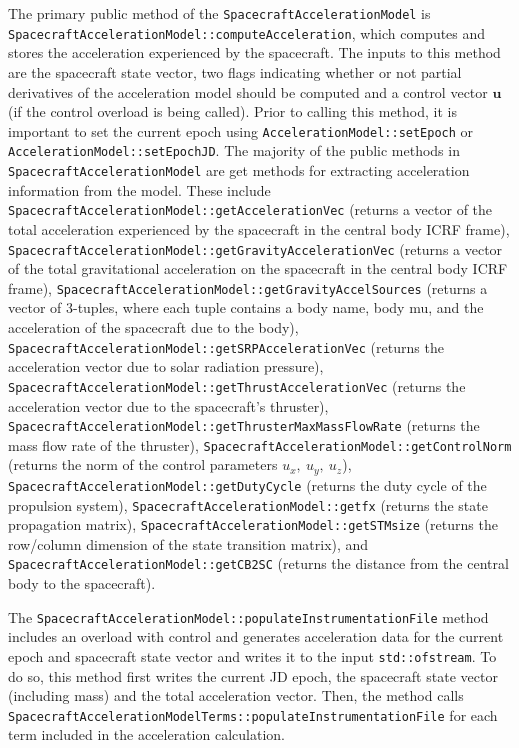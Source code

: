 The primary public method of the \texttt{SpacecraftAccelerationModel} is \texttt{SpacecraftAccelerationModel::computeAcceleration}, which computes and stores the acceleration experienced by the spacecraft. The inputs to this method are the spacecraft state vector, two flags indicating whether or not partial derivatives of the acceleration model should be computed and a control vector $\mathbf{u}$ (if the control overload is being called). Prior to calling this method, it is important to set the current epoch using \texttt{AccelerationModel::setEpoch} or \texttt{AccelerationModel::setEpochJD}. The majority of the public methods in \texttt{SpacecraftAccelerationModel} are get methods for extracting acceleration information from the model. These include \texttt{SpacecraftAccelerationModel::getAccelerationVec} (returns a vector of the total acceleration experienced by the spacecraft in the central body ICRF frame), \texttt{SpacecraftAccelerationModel::getGravityAccelerationVec} (returns a vector of the total gravitational acceleration on the spacecraft in the central body ICRF frame), \texttt{SpacecraftAccelerationModel::getGravityAccelSources} (returns a vector of 3-tuples, where each tuple contains a body name, body mu, and the acceleration of the spacecraft due to the body), \texttt{SpacecraftAccelerationModel::getSRPAccelerationVec} (returns the acceleration vector due to solar radiation pressure), \texttt{SpacecraftAccelerationModel::getThrustAccelerationVec} (returns the acceleration vector due to the spacecraft's thruster), \texttt{SpacecraftAccelerationModel::getThrusterMaxMassFlowRate} (returns the mass flow rate of the thruster), \texttt{SpacecraftAccelerationModel::getControlNorm} (returns the norm of the control parameters $u_x,~u_y,~u_z$), \texttt{SpacecraftAccelerationModel::getDutyCycle} (returns the duty cycle of the propulsion system), \texttt{SpacecraftAccelerationModel::getfx} (returns the state propagation matrix), \texttt{SpacecraftAccelerationModel::getSTMsize} (returns the row/column dimension of the state transition matrix), and \texttt{SpacecraftAccelerationModel::getCB2SC} (returns the distance from the central body to the spacecraft).

The \texttt{SpacecraftAccelerationModel::populateInstrumentationFile} method includes an overload with control and generates acceleration data for the current epoch and spacecraft state vector and writes it to the input \texttt{std::ofstream}. To do so, this method first writes the current JD epoch, the spacecraft state vector (including mass) and the total acceleration vector. Then, the method calls \texttt{SpacecraftAccelerationModelTerms::populateInstrumentationFile} for each term included in the acceleration calculation.

